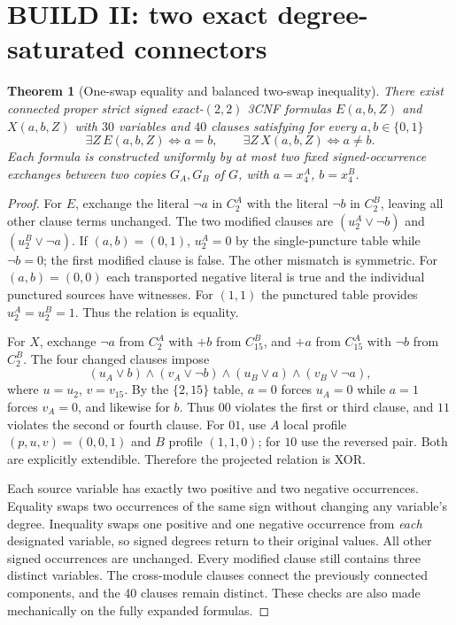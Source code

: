 \documentclass[11pt]{article}
\newtheorem{theorem}{Theorem}
\begin{document}
\section{BUILD II: two exact degree-saturated connectors}
\begin{theorem}[One-swap equality and balanced two-swap inequality]
There exist connected proper strict signed exact-$(2,2)$ 3CNF formulas $E(a,b,Z)$ and $X(a,b,Z)$ with $30$ variables and $40$ clauses satisfying for every $a,b\in\{0,1\}$
\[
 \exists Z\,E(a,b,Z)\iff a=b,
 \qquad \exists Z\,X(a,b,Z)\iff a\ne b.
\]
Each formula is constructed uniformly by at most two fixed signed-occurrence exchanges between two copies $G_A,G_B$ of $G$, with $a=x_4^A$, $b=x_4^B$.
\end{theorem}
\begin{proof}
For $E$, exchange the literal $\neg a$ in $C_2^A$ with the literal $\neg b$ in $C_2^B$, leaving all other clause terms unchanged. The two modified clauses are $(u_2^A\lor\neg b)$ and $(u_2^B\lor\neg a)$. If $(a,b)=(0,1)$, $u_2^A=0$ by the single-puncture table while $\neg b=0$; the first modified clause is false. The other mismatch is symmetric. For $(a,b)=(0,0)$ each transported negative literal is true and the individual punctured sources have witnesses. For $(1,1)$ the punctured table provides $u_2^A=u_2^B=1$. Thus the relation is equality.

For $X$, exchange $\neg a$ from $C_2^A$ with $+b$ from $C_{15}^B$, and $+a$ from $C_{15}^A$ with $\neg b$ from $C_2^B$. The four changed clauses impose
\[
 (u_A\lor b)\land(v_A\lor\neg b)
 \land(u_B\lor a)\land(v_B\lor\neg a),
\]
where $u=u_2$, $v=v_{15}$. By the $\{2,15\}$ table, $a=0$ forces $u_A=0$ while $a=1$ forces $v_A=0$, and likewise for $b$. Thus $00$ violates the first or third clause, and $11$ violates the second or fourth clause. For $01$, use $A$ local profile $(p,u,v)=(0,0,1)$ and $B$ profile $(1,1,0)$; for $10$ use the reversed pair. Both are explicitly extendible. Therefore the projected relation is XOR.

Each source variable has exactly two positive and two negative occurrences. Equality swaps two occurrences of the same sign without changing any variable's degree. Inequality swaps one positive and one negative occurrence from \emph{each} designated variable, so signed degrees return to their original values. All other signed occurrences are unchanged. Every modified clause still contains three distinct variables. The cross-module clauses connect the previously connected components, and the 40 clauses remain distinct. These checks are also made mechanically on the fully expanded formulas.
\end{proof}
\end{document}
